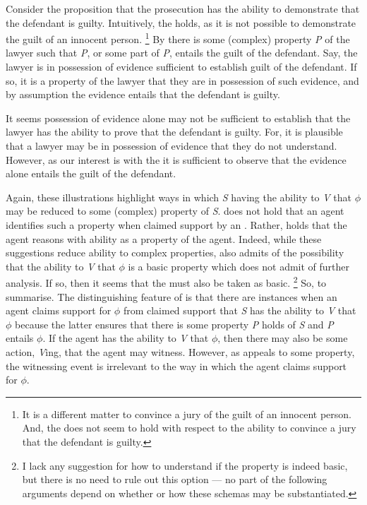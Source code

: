 \begin{note}
  \begin{illustration}
    Consider the proposition that the prosecution has the ability to demonstrate that the defendant is guilty.
    Intuitively, the \aben{} holds, as it is not possible to demonstrate the guilt of an innocent person.\nolinebreak
    \footnote{
      It is a different matter to convince a jury of the guilt of an innocent person.
      And, the \aben{} does not seem to hold with respect to the ability to convince a jury that the defendant is guilty.
    }
    By \AR{} there is some (complex) property \emph{P} of the lawyer such that \emph{P}, or some part of \emph{P}, entails the guilt of the defendant.
    Say, the lawyer is in possession of evidence sufficient to establish guilt of the defendant.
    If so, it is a property of the lawyer that they are in possession of such evidence, and by assumption the evidence entails that the defendant is guilty.

    It seems possession of evidence alone may not be sufficient to establish that the lawyer has the ability to prove that the defendant is guilty.
    For, it is plausible that a lawyer may be in possession of evidence that they do not understand.
    However, as our interest is with the \aben{} it is sufficient to observe that the evidence alone entails the guilt of the defendant.
  \end{illustration}

  Again, these illustrations highlight ways in which \emph{S} having the ability to \emph{V} that \(\phi\) may be reduced to some (complex) property of \emph{S}.
  \AR{} does not hold that an agent identifies such a property when claimed support by an \aben{}.
  Rather, \AR{} holds that the agent reasons with ability as a property of the agent.
  Indeed, while these suggestions reduce ability to complex properties, \AR{} also admits of the possibility that the ability to \emph{V} that \(\phi\) is a basic property which does not admit of further analysis.
  If so, then it seems that the \aben{} must also be taken as basic.\nolinebreak
  \footnote{
    I lack any suggestion for how to understand \AR{} if the property is indeed basic, but there is no need to rule out this option ---  no part of the following arguments depend on whether or how these schemas may be substantiated.
  }
  So, to summarise.
  The distinguishing feature of \AR{} is that there are instances when an agent claims support for \(\phi\) from claimed support that \emph{S} has the ability to \emph{V} that \(\phi\) because the latter ensures that there is some property \emph{P} holds of \emph{S} and \emph{P} entails \(\phi\).
  If the agent has the ability to \emph{V} that \(\phi\), then there may also be some action, \emph{V}ing, that the agent may witness.
  However, as \AR{} appeals to some property, the witnessing event is irrelevant to the way in which the agent claims support for \(\phi\).
\end{note}

